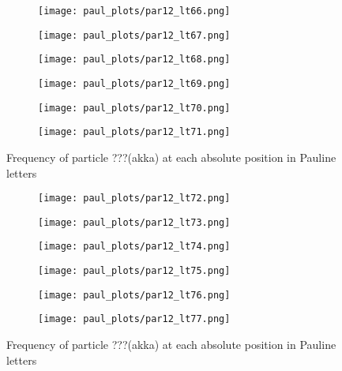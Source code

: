 \documentclass[a4paper]{article}
\begin{document}
\begin{figure}
\begin{subfigure}{0.45\textwidth}
\centering
\texttt{[image: paul\_plots/par12\_lt66.png]}
\end{subfigure}
\begin{subfigure}{0.45\textwidth}
\centering
\texttt{[image: paul\_plots/par12\_lt67.png]}
\end{subfigure}
\begin{subfigure}{0.45\textwidth}
\centering
\texttt{[image: paul\_plots/par12\_lt68.png]}
\end{subfigure}
\begin{subfigure}{0.45\textwidth}
\centering
\texttt{[image: paul\_plots/par12\_lt69.png]}
\end{subfigure}
\begin{subfigure}{0.45\textwidth}
\centering
\texttt{[image: paul\_plots/par12\_lt70.png]}
\end{subfigure}
\begin{subfigure}{0.45\textwidth}
\centering
\texttt{[image: paul\_plots/par12\_lt71.png]}
\end{subfigure}
\caption{Frequency of particle ???(akka) at each absolute position in Pauline letters}
\label{paul_akka}
\end{figure}

\begin{figure}
\ContinuedFloat
\begin{subfigure}{0.45\textwidth}
\centering
\texttt{[image: paul\_plots/par12\_lt72.png]}
\end{subfigure}
\begin{subfigure}{0.45\textwidth}
\centering
\texttt{[image: paul\_plots/par12\_lt73.png]}
\end{subfigure}
\begin{subfigure}{0.45\textwidth}
\centering
\texttt{[image: paul\_plots/par12\_lt74.png]}
\end{subfigure}
\begin{subfigure}{0.45\textwidth}
\centering
\texttt{[image: paul\_plots/par12\_lt75.png]}
\end{subfigure}
\begin{subfigure}{0.45\textwidth}
\centering
\texttt{[image: paul\_plots/par12\_lt76.png]}
\end{subfigure}
\begin{subfigure}{0.45\textwidth}
\centering
\texttt{[image: paul\_plots/par12\_lt77.png]}
\end{subfigure}
\caption{Frequency of particle ???(akka) at each absolute position in Pauline letters}
\end{figure}
\end{document}
